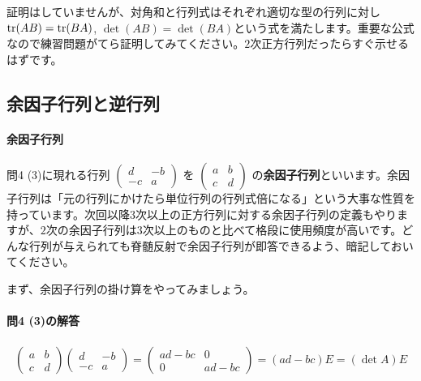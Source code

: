 証明はしていませんが、対角和と行列式はそれぞれ適切な型の行列に対し$\operatorname{tr} (AB) = \operatorname{tr} (BA)$, $\det (AB) = \det (BA)$という式を満たします。重要な公式なので練習問題がてら証明してみてください。$2$次正方行列だったらすぐ示せるはずです。

\subsection{余因子行列と逆行列}

\paragraph{余因子行列}
問4 (3)に現れる行列
$\begin{pmatrix}
d & -b \\
-c & a
\end{pmatrix}$
を
$\begin{pmatrix}
a & b \\
c & d
\end{pmatrix}$
の\textbf{余因子行列}といいます。余因子行列は「元の行列にかけたら単位行列の行列式倍になる」という大事な性質を持っています。次回以降$3$次以上の正方行列に対する余因子行列の定義もやりますが、$2$次の余因子行列は$3$次以上のものと比べて格段に使用頻度が高いです。どんな行列が与えられても脊髄反射で余因子行列が即答できるよう、暗記しておいてください。

まず、余因子行列の掛け算をやってみましょう。

\paragraph{問4 (3)の解答}
\begin{align*}
\begin{pmatrix}
a & b \\
c & d
\end{pmatrix}
\begin{pmatrix}
d & -b \\
-c & a
\end{pmatrix}
=
\begin{pmatrix}
ad-bc & 0 \\
0 & ad-bc
\end{pmatrix}
=
(ad-bc)E
= (\det A) E
\end{align*}

